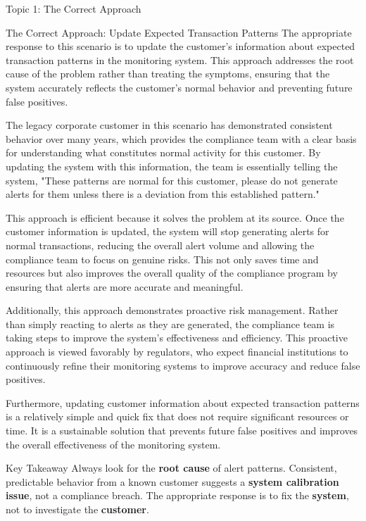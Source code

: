 \documentclass[5pt]{beamer}
\begin{document}
	\begin{frame}{Topic 1: The Correct Approach}
		\begin{block}{\tiny The Correct Approach: Update Expected Transaction Patterns}
			\tiny The appropriate response to this scenario is to update the customer's information about expected transaction patterns in the monitoring system. This approach addresses the root cause of the problem rather than treating the symptoms, ensuring that the system accurately reflects the customer's normal behavior and preventing future false positives.
			
			The legacy corporate customer in this scenario has demonstrated consistent behavior over many years, which provides the compliance team with a clear basis for understanding what constitutes normal activity for this customer. By updating the system with this information, the team is essentially telling the system, "These patterns are normal for this customer, please do not generate alerts for them unless there is a deviation from this established pattern."
			
			This approach is efficient because it solves the problem at its source. Once the customer information is updated, the system will stop generating alerts for normal transactions, reducing the overall alert volume and allowing the compliance team to focus on genuine risks. This not only saves time and resources but also improves the overall quality of the compliance program by ensuring that alerts are more accurate and meaningful.
			
			Additionally, this approach demonstrates proactive risk management. Rather than simply reacting to alerts as they are generated, the compliance team is taking steps to improve the system's effectiveness and efficiency. This proactive approach is viewed favorably by regulators, who expect financial institutions to continuously refine their monitoring systems to improve accuracy and reduce false positives.
			
			Furthermore, updating customer information about expected transaction patterns is a relatively simple and quick fix that does not require significant resources or time. It is a sustainable solution that prevents future false positives and improves the overall effectiveness of the monitoring system.
		\end{block}
		
		\begin{alertblock}{Key Takeaway}
			\tiny Always look for the \textbf{root cause} of alert patterns. Consistent, predictable behavior from a known customer suggests a \textbf{system calibration issue}, not a compliance breach. The appropriate response is to fix the \textbf{system}, not to investigate the \textbf{customer}.
		\end{alertblock}
	\end{frame}
	
\end{document}
